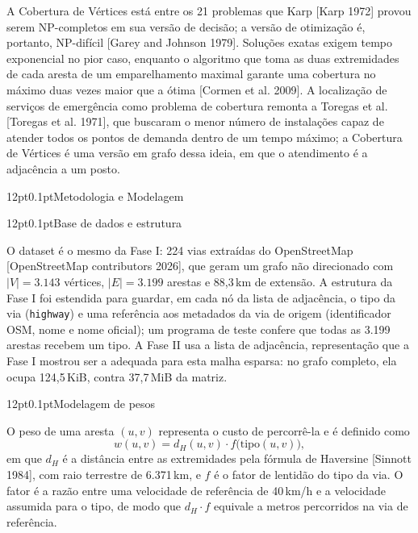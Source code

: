 \documentclass[12pt,a4paper]{article}
\makeatletter
\renewcommand\section{\@startsection{section}{1}{\z@}%
  {12pt}{0.1pt}{\normalfont\fontsize{13}{15}\selectfont\bfseries}}
\renewcommand\subsection{\@startsection{subsection}{2}{\z@}%
  {12pt}{0.1pt}{\normalfont\normalsize\bfseries}}
\makeatother
\begin{document}
A Cobertura de Vértices está entre os 21 problemas que Karp [Karp 1972] provou serem NP-completos em sua versão de decisão; a versão de otimização é, portanto, NP-difícil [Garey and Johnson 1979]. Soluções exatas exigem tempo exponencial no pior caso, enquanto o algoritmo que toma as duas extremidades de cada aresta de um emparelhamento maximal garante uma cobertura no máximo duas vezes maior que a ótima [Cormen et al. 2009]. A localização de serviços de emergência como problema de cobertura remonta a Toregas et al. [Toregas et al. 1971], que buscaram o menor número de instalações capaz de atender todos os pontos de demanda dentro de um tempo máximo; a Cobertura de Vértices é uma versão em grafo dessa ideia, em que o atendimento é a adjacência a um posto.

\section{Metodologia e Modelagem}

\subsection{Base de dados e estrutura}

O dataset é o mesmo da Fase I: 224 vias extraídas do OpenStreetMap [OpenStreetMap contributors 2026], que geram um grafo não direcionado com $|V| = 3.143$ vértices, $|E| = 3.199$ arestas e 88,3\,km de extensão. A estrutura da Fase I foi estendida para guardar, em cada nó da lista de adjacência, o tipo da via (\texttt{highway}) e uma referência aos metadados da via de origem (identificador OSM, nome e nome oficial); um programa de teste confere que todas as 3.199 arestas recebem um tipo. A Fase II usa a lista de adjacência, representação que a Fase I mostrou ser a adequada para esta malha esparsa: no grafo completo, ela ocupa 124,5\,KiB, contra 37,7\,MiB da matriz.

\subsection{Modelagem de pesos}

O peso de uma aresta $(u,v)$ representa o custo de percorrê-la e é definido como
\begin{equation}
w(u,v) = d_H(u,v)\cdot f\big(\mathrm{tipo}(u,v)\big),
\label{eq:peso}
\end{equation}
em que $d_H$ é a distância entre as extremidades pela fórmula de Haversine [Sinnott 1984], com raio terrestre de 6.371\,km, e $f$ é o fator de lentidão do tipo da via. O fator é a razão entre uma velocidade de referência de 40\,km/h e a velocidade assumida para o tipo, de modo que $d_H \cdot f$ equivale a metros percorridos na via de referência.
\end{document}
